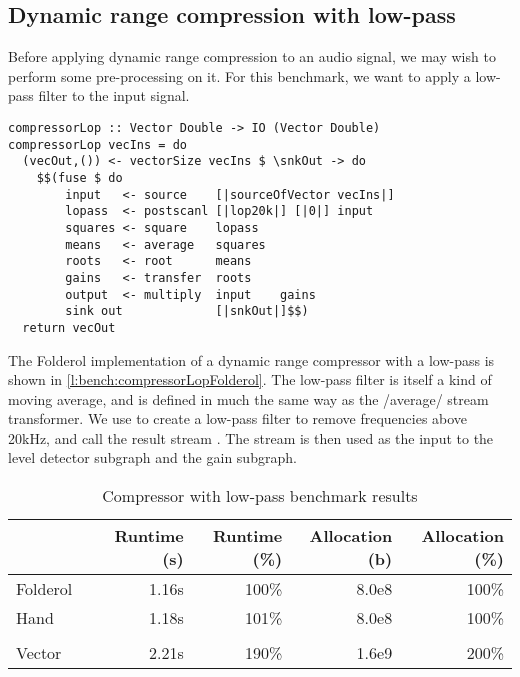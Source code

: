 \subsection{Dynamic range compression with low-pass}
Before applying dynamic range compression to an audio signal, we may wish to perform some pre-processing on it.
For this benchmark, we want to apply a low-pass filter to the input signal.

\begin{lstlisting}[float,label=l:bench:compressorLopFolderol,caption=Folderol implementation of \Hs/compressor/ with low-pass]
compressorLop :: Vector Double -> IO (Vector Double)
compressorLop vecIns = do
  (vecOut,()) <- vectorSize vecIns $ \snkOut -> do
    $$(fuse $ do
        input   <- source    [|sourceOfVector vecIns|]
        lopass  <- postscanl [|lop20k|] [|0|] input
        squares <- square    lopass
        means   <- average   squares
        roots   <- root      means
        gains   <- transfer  roots
        output  <- multiply  input    gains
        sink out             [|snkOut|]$$)
  return vecOut
\end{lstlisting}

The Folderol implementation of a dynamic range compressor with a low-pass is shown in \cref{l:bench:compressorLopFolderol}.
The low-pass filter is itself a kind of moving average, and is defined in much the same way as the \Hs/average/ stream transformer.
We use \Hs@postscanl@ to create a low-pass filter to remove frequencies above 20kHz, and call the result stream \Hs@lopass@.
The \Hs@lopass@ stream is then used as the input to the level detector subgraph and the gain subgraph.

\begin{table}
\begin{center}
\begin{tabular}{ll|rrrr}
& & Runtime (s)  & Runtime (\%) & Allocation (b) & Allocation (\%) \\
\hline
Folderol &          & 1.16s &   100\% & 8.0e8 & 100\% \\
Hand     &          & 1.18s &   101\% & 8.0e8 & 100\% \\
&&&\\
Vector &            & 2.21s &   190\% & 1.6e9 & 200\%\\
\end{tabular}
\end{center}
\caption[Compressor with low-pass benchmark results]{Compressor with low-pass benchmark results}
\label{table:bench:compressorlop}
\end{table}

